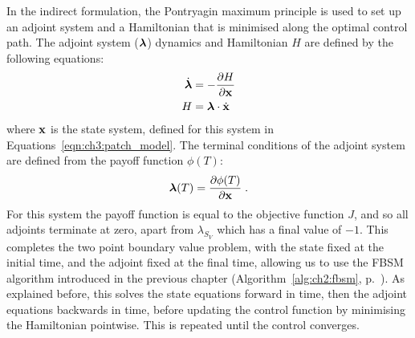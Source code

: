 In the indirect formulation, the Pontryagin maximum principle is used to set up an adjoint system and a Hamiltonian that is minimised along the optimal control path. The adjoint system ($\mathbf{\bm{\lambda}}$) dynamics and Hamiltonian $H$ are defined by the following equations:
\begin{subequations}\label{eqn:ch3:adjoint_hamiltonian}
    \begin{align}
        \dot{\mathbf{\bm{\lambda}}} &= -\frac{\partial{}H}{\partial\mathbf{\bm{x}}} \label{eqn:ch3:adjoint_hamiltonian_a}\\
        H &= \mathbf{\bm{\lambda}}\cdot\dot{\mathbf{\bm{x}}} \label{eqn:ch3:adjoint_hamiltonian_b}
    \end{align}
\end{subequations}
where $\mathbf{\bm{x}}$ is the state system, defined for this system in Equations~\ref{eqn:ch3:patch_model}. The terminal conditions of the adjoint system are defined from the payoff function $\phi(T)$:
\begin{equation}
    \mathbf{\bm{\lambda}}(T) = \frac{\partial\phi(T)}{\partial\mathbf{\bm{x}}}\;.
\end{equation}
For this system the payoff function is equal to the objective function $J$, and so all adjoints terminate at zero, apart from $\lambda_{S_V}$ which has a final value of $-1$. This completes the two point boundary value problem, with the state fixed at the initial time, and the adjoint fixed at the final time, allowing us to use the FBSM algorithm introduced in the previous chapter (Algorithm~\ref{alg:ch2:fbsm}, p.~\pageref{alg:ch2:fbsm}). As explained before, this solves the state equations forward in time, then the adjoint equations backwards in time, before updating the control function by minimising the Hamiltonian pointwise. This is repeated until the control converges.


